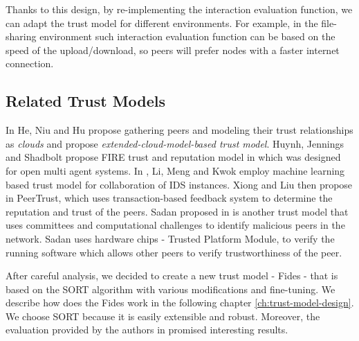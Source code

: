 Thanks to this design, by re-implementing the interaction evaluation function, we can adapt the trust model for different environments.
For example, in the file-sharing environment such interaction evaluation function can be based on the speed of the upload/download, so peers will prefer nodes with a faster internet connection.


\subsection{Related Trust Models}
\label{subsec:related-trust-models}
In \cite{1562680} He, Niu and Hu propose gathering peers and modeling their trust relationships as \textit{clouds} and propose \textit{extended-cloud-model-based trust model}.
Huynh, Jennings and Shadbolt propose FIRE trust and reputation model in \cite{huynh2006integrated} which was designed for open multi agent systems.
In \cite{li2014design}, Li, Meng and Kwok employ machine learning based trust model for collaboration of IDS instances.
Xiong and Liu then propose in \cite{xiong2004peertrust} PeerTrust, which uses transaction-based feedback system to determine the reputation and trust of the peers.
Sadan proposed in \cite{abera2019sadan} is another trust model that uses committees and computational challenges to identify malicious peers in the network.
Sadan uses hardware chips - Trusted Platform Module, to verify the running software which allows other peers to verify trustworthiness of the peer.

\vspace{1cm}

\noindent
After careful analysis, we decided to create a new trust model - Fides - that is based on the SORT algorithm with various modifications and fine-tuning.
We describe how does the Fides work in the following chapter \ref{ch:trust-model-design}.
We choose SORT because it is easily extensible and robust. 
Moreover, the evaluation provided by the authors in \cite{sort} promised interesting results.